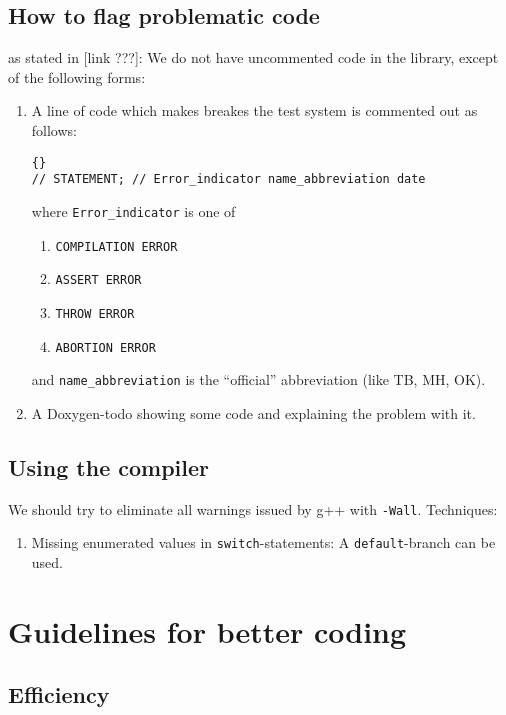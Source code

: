 \documentclass{book}
\begin{document}
\section{How to flag problematic code}
\label{sec:howflaggingproblematiccode}

as stated in [link ???]: We do not have uncommented code in the library, except of the following forms:
\begin{enumerate}
\item A line of code which makes breakes the test system is commented out as follows:
\begin{lstlisting}{}
// STATEMENT; // Error_indicator name_abbreviation date
\end{lstlisting}
where \texttt{Error\_indicator} is one of
\begin{enumerate}
\item \texttt{COMPILATION ERROR}
\item \texttt{ASSERT ERROR}
\item \texttt{THROW ERROR}
\item \texttt{ABORTION ERROR}
\end{enumerate}
and \texttt{name\_abbreviation} is the ``official'' abbreviation (like TB, MH, OK).
\item A Doxygen-todo showing some code and explaining the problem with it.
\end{enumerate}


\section{Using the compiler}
\label{sec:usingthecompiler}

We should try to eliminate all warnings issued by g++ with \texttt{-Wall}. Techniques:
\begin{enumerate}
\item Missing enumerated values in \texttt{switch}-statements: A \texttt{default}-branch can be used.
\end{enumerate}
 
\chapter{Guidelines for better coding}
\label{cha:TestingSystemGuidelines}

\section{Efficiency}
\label{sec:Efficiency}
\end{document}
